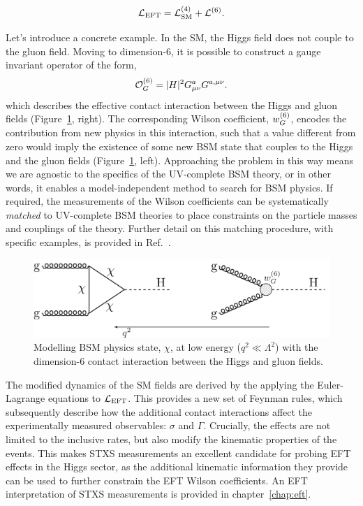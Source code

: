 \begin{equation}\label{eq:eft_expansion}
    \mathcal{L}_{\rm{EFT}} = \mathcal{L}^{\rm{(4)}}_{\rm{SM}} + \mathcal{L}^{\rm{(6)}}.
\end{equation}

Let's introduce a concrete example. In the SM, the Higgs field does not couple to the gluon field. Moving to dimension-6, it is possible to construct a gauge invariant operator of the form,
\begin{equation}
    \mathcal{O}^{\rm{(6)}}_G = |H|^2G^a_{\mu\nu}G^{a,\mu\nu}.
\end{equation}
\noindent
which describes the effective contact interaction between the Higgs and gluon fields (Figure~\ref{fig:eft_gluon}, right). The corresponding Wilson coefficient, $w^{\rm{(6)}}_G$, encodes the contribution from new physics in this interaction, such that a value different from zero would imply the existence of some new BSM state that couples to the Higgs and the gluon fields (Figure~\ref{fig:eft_gluon}, left). Approaching the problem in this way means we are agnostic to the specifics of the UV-complete BSM theory, or in other words, it enables a model-independent method to search for BSM physics. If required, the measurements of the Wilson coefficients can be systematically \textit{matched} to UV-complete BSM theories to place constraints on the particle masses and couplings of the theory. Further detail on this matching procedure, with specific examples, is provided in Ref.~\cite{Marzocca:2020jze}. 

\begin{figure}[htb!]
  \centering
  \includegraphics[width=.8\linewidth]{Figures/theory/og_operator.pdf}
  \caption[Higgs-gluon contact interaction]
  {
    Modelling BSM physics state, $\chi$, at low energy ($q^2\ll\Lambda^2$) with the dimension-6 contact interaction between the Higgs and gluon fields.
  }
  \label{fig:eft_gluon}
\end{figure}

The modified dynamics of the SM fields are derived by the applying the Euler-Lagrange equations to $\mathcal{L}_{\rm{EFT}}$. This provides a new set of Feynman rules, which subsequently describe how the additional contact interactions affect the experimentally measured observables: $\sigma$ and $\Gamma$. Crucially, the effects are not limited to the inclusive rates, but also modify the kinematic properties of the events. This makes STXS measurements an excellent candidate for probing EFT effects in the Higgs sector, as the additional kinematic information they provide can be used to further constrain the EFT Wilson coefficients. An EFT interpretation of STXS measurements is provided in chapter~\ref{chap:eft}.

